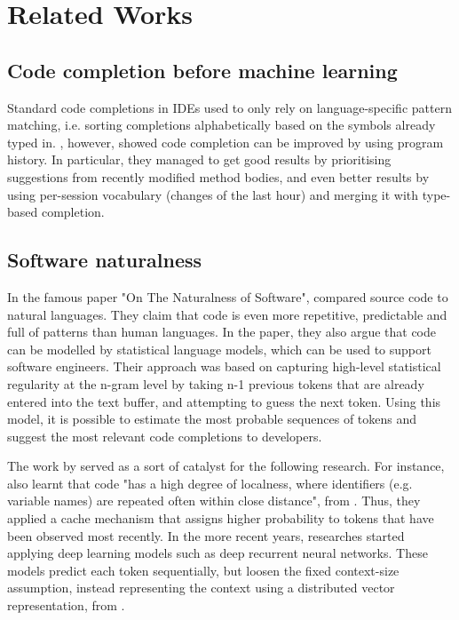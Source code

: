 \chapter{Related Works}
\label{chap:Related Works}

\section{Code completion before machine learning}
Standard code completions in IDEs used to only rely on language-specific pattern matching, i.e. sorting completions alphabetically based on the symbols already typed in. \cite{Robb08a}, however, showed code completion can be improved by using program history. In particular, they managed to get good results by prioritising suggestions from recently modified method bodies, and even better results by using per-session vocabulary (changes of the last hour) and merging it with type-based completion.

\section{Software naturalness}
In the famous paper "On The Naturalness of Software", \cite{Hind12a} compared source code to natural languages. They claim that code is even more repetitive, predictable and full of patterns than human languages. In the paper, they also argue that code can be modelled by statistical language models, which can be used to support software engineers. Their approach was based on capturing high-level statistical regularity at the n-gram level by taking n-1 previous tokens that are already entered into the text buffer, and attempting to guess the next token. Using this model, it is possible to estimate the most probable sequences of tokens and suggest the most relevant code completions to developers.

The work by \cite{Hind12a} served as a sort of catalyst for the following research. For instance, \cite{Tu14a} also learnt that code "has a high degree of localness, where identifiers (e.g. variable names) are repeated often within close distance", from \cite{Alla18a}. Thus, they applied a cache mechanism that assigns higher probability to tokens that have been observed most recently. In the more recent years, researches started applying deep learning models such as deep recurrent neural networks. These models predict each token sequentially, but loosen the fixed context-size assumption, instead representing the context using a distributed vector representation, from \cite{Alla18a}.

